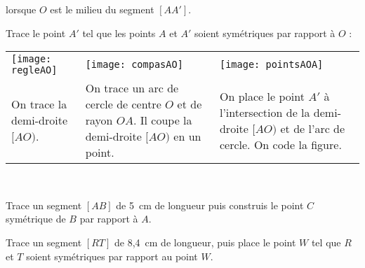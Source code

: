 \begin{methode*1}

\begin{aconnaitre}
 lorsque $O$ est le milieu du segment $[AA']$. 
\end{aconnaitre}

\begin{exemple*1}
Trace le point $A'$ tel que les points $A$ et $A'$ soient symétriques par rapport à $O$ : \\[0.5em]
\begin{tabularx}{\textwidth}{X|X|X}
 \texttt{[image: regleAO]} &  \texttt{[image: compasAO]} & \texttt{[image: pointsAOA]} \\ 
 On trace la demi-droite $[AO)$. & On trace un arc de cercle de centre $O$ et de rayon $OA$. Il coupe la demi-droite $[AO)$ en un point. & On place le point $A'$ à l'intersection de la demi-droite $[AO)$ et de l'arc de cercle. On code la figure. \\
\end{tabularx} \\
 \end{exemple*1}


\exercice
Trace un segment $[AB]$ de 5 cm de longueur puis construis le point $C$ symétrique de $B$ par rapport à $A$.

\exercice
Trace un segment $[RT]$ de 8,4 cm de longueur, puis place le point $W$ tel que $R$ et $T$ soient symétriques par rapport au point $W$.
 
\end{methode*1}



